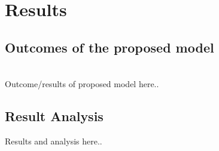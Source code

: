 \chapter{Results}
\label{Chapter 4}
\section{Outcomes of the proposed model}\\
Outcome/results of proposed model here..
\section{Result Analysis}
Results and analysis here..
